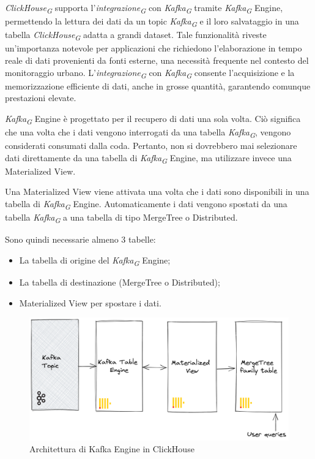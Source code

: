 \textit{ClickHouse}\textsubscript{\textit{G}} supporta l'\textit{integrazione}\textsubscript{\textit{G}} con \textit{Kafka}\textsubscript{\textit{G}} tramite \textit{Kafka}\textsubscript{\textit{G}} Engine, permettendo la lettura dei dati da un topic \textit{Kafka}\textsubscript{\textit{G}} e il loro salvataggio in una tabella \textit{ClickHouse}\textsubscript{\textit{G}} adatta a grandi dataset. Tale funzionalità riveste un'importanza notevole per applicazioni che richiedono l'elaborazione in tempo reale di dati provenienti da fonti esterne, una necessità frequente nel contesto del monitoraggio urbano. L'\textit{integrazione}\textsubscript{\textit{G}} con \textit{Kafka}\textsubscript{\textit{G}} consente l'acquisizione e la memorizzazione efficiente di dati, anche in grosse quantità, garantendo comunque prestazioni elevate.

\textit{Kafka}\textsubscript{\textit{G}} Engine è progettato per il recupero di dati una sola volta. Ciò significa che una volta che i dati vengono interrogati da una tabella \textit{Kafka}\textsubscript{\textit{G}}, vengono considerati consumati dalla coda. Pertanto, non si dovrebbero mai selezionare dati direttamente da una tabella di \textit{Kafka}\textsubscript{\textit{G}} Engine, ma utilizzare invece una Materialized View.

Una Materialized View viene attivata una volta che i dati sono disponibili in una tabella di \textit{Kafka}\textsubscript{\textit{G}} Engine. Automaticamente i dati vengono spostati da una tabella \textit{Kafka}\textsubscript{\textit{G}} a una tabella di tipo MergeTree o Distributed.

Sono quindi necessarie almeno 3 tabelle:

\begin{itemize}
  \item La tabella di origine del \textit{Kafka}\textsubscript{\textit{G}} Engine;
  \item La tabella di destinazione (MergeTree o Distributed);
  \item Materialized View per spostare i dati.
\end{itemize}

\begin{figure}[H]
	\centering
	\includegraphics[width=.7\textwidth]{../Images/SpecificaTecnica/kafka_engine_architecture.png}
	\caption{Architettura di Kafka Engine in ClickHouse}
	\label{fig:Architettura_kafka_engine}
\end{figure}

